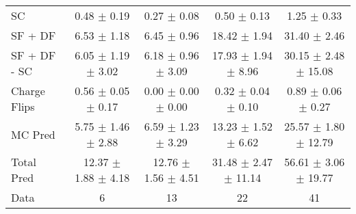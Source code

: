 \begin{tabular}{l|cccc}
                                 SC &  0.48 $\pm$  0.19 &  0.27 $\pm$  0.08 &  0.50 $\pm$  0.13 &  1.25 $\pm$  0.33 \\
                            SF + DF &  6.53 $\pm$  1.18 &  6.45 $\pm$  0.96 & 18.42 $\pm$  1.94 & 31.40 $\pm$  2.46 \\
\hline
                       SF + DF - SC &  6.05 $\pm$  1.19 $\pm$  3.02 &  6.18 $\pm$  0.96 $\pm$  3.09 & 17.93 $\pm$  1.94 $\pm$  8.96 & 30.15 $\pm$  2.48 $\pm$ 15.08 \\
\hline\hline
                       Charge Flips &  0.56 $\pm$  0.05 $\pm$  0.17 &  0.00 $\pm$  0.00 $\pm$  0.00 &  0.32 $\pm$  0.04 $\pm$  0.10 &  0.89 $\pm$  0.06 $\pm$  0.27 \\
\hline
                            MC Pred &  5.75 $\pm$  1.46 $\pm$  2.88 &  6.59 $\pm$  1.23 $\pm$  3.29 & 13.23 $\pm$  1.52 $\pm$  6.62 & 25.57 $\pm$  1.80 $\pm$ 12.79 \\
\hline
                         Total Pred & 12.37 $\pm$  1.88 $\pm$  4.18 & 12.76 $\pm$  1.56 $\pm$  4.51 & 31.48 $\pm$  2.47 $\pm$ 11.14 & 56.61 $\pm$  3.06 $\pm$ 19.77 \\
\hline\hline
                               Data &     6 &    13 &    22 &    41 \\
\hline\hline
\end{tabular}

